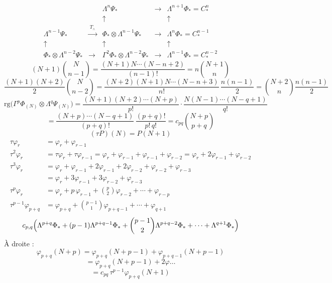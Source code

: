 \documentclass[11pt,a4paper]{article}
\begin{document}
\[
\begin{array}{ccccc}
 & & \Lambda^n\Psi_* & \longrightarrow & \Lambda^{n+1}\Phi_* = C^n_* \\
 & & \uparrow & & \uparrow \\
\Lambda^{n-1}\Psi_* & \xrightarrow{\;T_\wedge\;} & \Phi_*\otimes\Lambda^{n-1}\Psi_* & \longrightarrow & \Lambda^n\Phi_* = C^{n-1}_* \\
\uparrow & & \uparrow & & \uparrow \\
\Phi_*\otimes\Lambda^{n-2}\Psi_* & \longrightarrow & \Gamma^2\Phi_*\otimes\Lambda^{n-2}\Psi_* & \longrightarrow & \Lambda^{n-1}\Phi_* = C^{n-2}_*
\end{array}
\]
\[
(N+1)\binom{N}{n-1} = \frac{(N+1)N\cdots(N-n+2)}{(n-1)!} = n\binom{N+1}{n}
\]
\[
\frac{(N+1)(N+2)}{2}\binom{N}{n-2} = \frac{(N+2)(N+1)N\cdots(N-n+3)}{n!}\,\frac{n(n-1)}{2}
= \binom{N+2}{n}\frac{n(n-1)}{2}
\]
\[
\mathrm{rg}\bigl(\Gamma^p\Phi_{(N)}\otimes\Lambda^q\Psi_{(N)}\bigr)
= \frac{(N+1)(N+2)\cdots(N+p)}{p!}\cdot\frac{N(N-1)\cdots(N-q+1)}{q!}
\]
\[
= \frac{(N+p)\cdots(N-q+1)}{(p+q)!}\,\frac{(p+q)!}{p!\,q!} = c_{pq}\binom{N+p}{p+q}
\]
\[
(\tau P)(N) = P(N+1)
\]
\[
\begin{aligned}
\tau\varphi_r &= \varphi_r + \varphi_{r-1} \\
\tau^2\varphi_r &= \tau\varphi_r + \tau\varphi_{r-1} = \varphi_r + \varphi_{r-1} + \varphi_{r-1} + \varphi_{r-2}
= \varphi_r + 2\varphi_{r-1} + \varphi_{r-2} \\
\tau^3\varphi_r &= \varphi_r + \varphi_{r-1} + 2\varphi_{r-1} + 2\varphi_{r-2} + \varphi_{r-2} + \varphi_{r-3} \\
&= \varphi_r + 3\varphi_{r-1} + 3\varphi_{r-2} + \varphi_{r-3} \\
\tau^p\varphi_r &= \varphi_r + p\,\varphi_{r-1} + \binom p2\varphi_{r-2} + \cdots + \varphi_{r-p} \\
\tau^{p-1}\varphi_{p+q} &= \varphi_{p+q} + \binom{p-1}{1}\varphi_{p+q-1} + \cdots + \varphi_{q+1}
\end{aligned}
\]
\[
c_{p,q}\Bigl(\Lambda^{p+q}\Phi_* + (p-1)\Lambda^{p+q-1}\Phi_* + \binom{p-1}{2}\Lambda^{p+q-2}\Phi_* + \cdots + \Lambda^{q+1}\Phi_*\Bigr)
\]
À droite :
\[
\varphi_{p+q}(N+p) = \varphi_{p+q}(N+p-1) + \varphi_{p+q-1}(N+p-1)
\]
\[
= \varphi_{p+q}(N+p-1) + 2\varphi\ldots
\]
\[
= c_{pq}\,\tau^{p-1}\varphi_{p+q}(N+1)
\]
\end{document}
